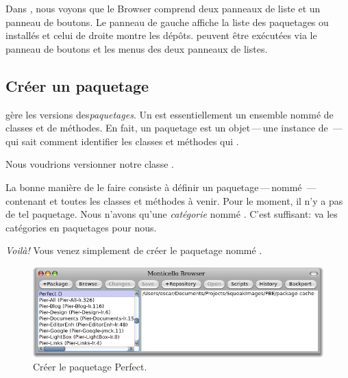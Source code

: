 \documentclass[a4paper,10pt,twoside]{book}
\begin{document}
Dans , nous voyons que le \MC Browser 
comprend deux panneaux de liste et un panneau de boutons. Le panneau
de gauche affiche la liste des paquetages ou  installés
et celui de droite montre les dépôts.
 peuvent être exécutées via le panneau de
boutons et les menus des deux panneaux de listes. %

\subsection{Créer un paquetage}

\MC gère les versions des\emph{paquetages}.  Un  est
essentiellement un ensemble nommé de classes et de méthodes.
En fait, un paquetage est un objet\,---\,une instance de
\,---\,qui sait comment identifier les classes et
méthodes qui .

Nous voudrions versionner notre classe .

La bonne manière de le faire consiste à définir un
paquetage\,---\,nommé \,---\,contenant
 et toutes les classes et méthodes à venir. Pour le
moment, il n'y a pas de tel paquetage. Nous n'avons qu'une
\emph{catégorie} nommé %
. %
C'est suffisant: \MC va  les catégories en
paquetages pour nous.


\emph{Voilà!} Vous venez simplement de créer le paquetage \MC nommé . 

\begin{figure}[ht]\centering
	\includegraphics[width=\textwidth]{perfectPackage}
	\caption{Créer le paquetage Perfect.}
\end{figure}
\end{document}
